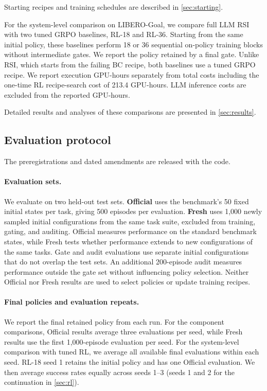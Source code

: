 Starting recipes and training schedules are described in \cref{sec:starting}.

For the system-level comparison on LIBERO-Goal, we compare full LLM RSI with two tuned GRPO baselines, RL-18 and RL-36. Starting from the same initial policy, these baselines perform 18 or 36 sequential on-policy training blocks
without intermediate gates. We report the policy retained by a final gate. Unlike RSI, which starts from the failing BC recipe, both baselines use a tuned GRPO recipe. We report execution GPU-hours separately from total costs
including the one-time RL recipe-search cost of 213.4 GPU-hours. LLM inference costs are excluded from the reported GPU-hours.

Detailed results and analyses of these comparisons
are presented in \cref{sec:results}.

\subsection{Evaluation protocol}
\label{sec:protocol}
The preregistrations and dated amendments are released with the code.

\paragraph{Evaluation sets.} We evaluate on two held-out test sets. \textbf{Official} uses the benchmark's 50 fixed initial states per task, giving 500 episodes per evaluation. \textbf{Fresh} uses 1,000 newly sampled initial configurations from the same task suite, excluded from training, gating, and auditing. Official measures performance on the standard benchmark states, while Fresh tests whether performance extends to new configurations of the same tasks.
Gate and audit evaluations use separate initial configurations that do not overlap the test sets. An additional 200-episode audit measures performance outside the gate set without influencing policy selection. Neither Official nor Fresh results are used to select policies or update training recipes.

\paragraph{Final policies and evaluation repeats.} We report the final retained policy from each run. For the component comparisons, Official results average three evaluations per seed, while Fresh results use the
first 1,000-episode evaluation per seed. For the system-level comparison with tuned RL, we average all available final evaluations within each seed.
RL-18 seed 1 retains the initial policy and has one Official evaluation.
We then average success rates equally across seeds 1--3 (seeds 1 and 2 for the continuation in \cref{sec:rl}).


